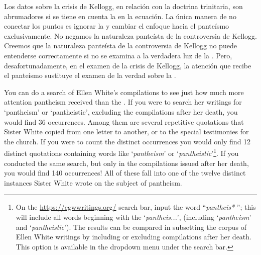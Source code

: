 Los datos sobre la crisis de Kellogg, en relación con la doctrina trinitaria, son abrumadores si se tiene en cuenta la  en la ecuación. La única manera de no conectar los puntos es ignorar la  y cambiar el enfoque hacia el panteísmo exclusivamente. No negamos la naturaleza panteísta de la controversia de Kellogg. Creemos que la naturaleza panteísta de la controversia de Kellogg no puede entenderse correctamente si no se examina a la verdadera luz de la . Pero, desafortunadamente, en el examen de la crisis de Kellogg, la atención que recibe el panteísmo sustituye el examen de la verdad sobre la .


You can do a search of Ellen White’s compilations to see just how much more attention pantheism received than the . If you were to search her writings for ‘pantheism’ or ‘pantheistic’, excluding the compilations after her death, you would find 36 occurrences. Among them are several repetitive quotations that Sister White copied from one letter to another, or to the special testimonies for the church. If you were to count the distinct occurrences you would only find 12 distinct quotations containing words like ‘\textit{pantheism}’ or ‘\textit{pantheistic}’\footnote{On the \href{https://egwwritings.org/}{https://egwwritings.org/} search bar, input the word “\textit{pantheis*} ”; this will include all words beginning with the ‘\textit{pantheis...}’, (including ‘\textit{pantheism}’ and ‘\textit{pantheistic}’). The results can be compared in subsetting the corpus of Ellen White writings by including or excluding compilations after her death. This option is available in the dropdown menu under the search bar.}. If you conducted the same search, but only in the compilations issued after her death, you would find 140 occurrences! All of these fall into one of the twelve distinct instances Sister White wrote on the subject of pantheism.


